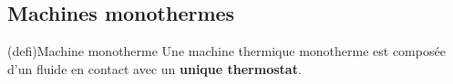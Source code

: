 \documentclass[../../main/main.tex]{subfiles}
\begin{document}
\subsection{Machines monothermes}
\begin{tcb*}[sidebyside](defi){Machine monotherme}
	Une machine thermique monotherme est composée d'un fluide en contact avec un
	\textbf{unique thermostat}.
	\tcblower
	\begin{center}
		\vspace{-15pt}
	\end{center}
\end{tcb*}
\end{document}
